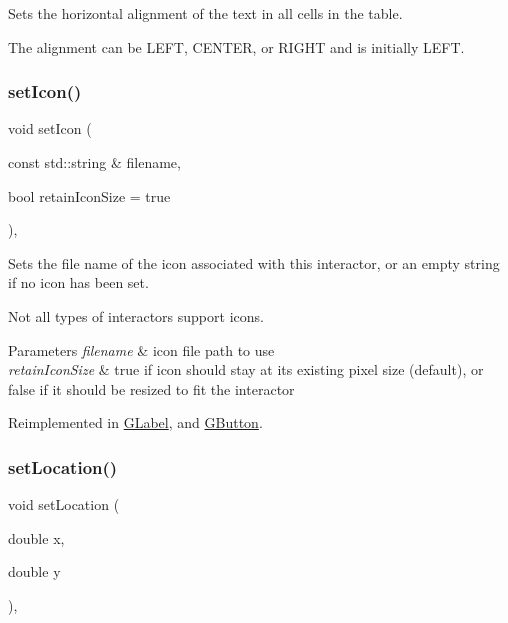 Sets the horizontal alignment of the text in all cells in the table. 

The alignment can be L\+E\+FT, C\+E\+N\+T\+ER, or R\+I\+G\+HT and is initially L\+E\+FT. \mbox{\label{classGInteractor_a762e139aa311461c3984d3ad28293f64}} 
\subsubsection{\texorpdfstring{set\+Icon()}{setIcon()}}
{\footnotesize\ttfamily void set\+Icon (\begin{DoxyParamCaption}\item[{const std\+::string \&}]{filename,  }\item[{bool}]{retain\+Icon\+Size = {\ttfamily true} }\end{DoxyParamCaption})\hspace{0.3cm}{\ttfamily [virtual]}, {\ttfamily [inherited]}}



Sets the file name of the icon associated with this interactor, or an empty string if no icon has been set. 

Not all types of interactors support icons. 
\begin{DoxyParams}{Parameters}
{\em filename} & icon file path to use \\
\hline
{\em retain\+Icon\+Size} & true if icon should stay at its existing pixel size (default), or false if it should be resized to fit the interactor \\
\hline
\end{DoxyParams}


Reimplemented in \mbox{\hyperlink{classGLabel_a75753a3d7d3364185f8088d63b664cb1}{G\+Label}}, and \mbox{\hyperlink{classGButton_a75753a3d7d3364185f8088d63b664cb1}{G\+Button}}.

\mbox{\label{classGInteractor_a04594e8ba9b98513a64f1da00dcae18c}} 
\subsubsection{\texorpdfstring{set\+Location()}{setLocation()}}
{\footnotesize\ttfamily void set\+Location (\begin{DoxyParamCaption}\item[{double}]{x,  }\item[{double}]{y }\end{DoxyParamCaption})\hspace{0.3cm}{\ttfamily [virtual]}, {\ttfamily [inherited]}}



